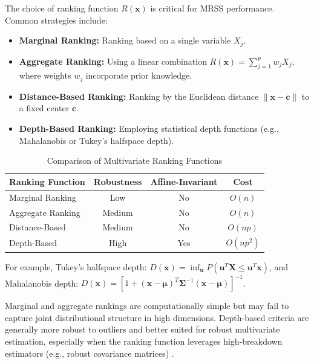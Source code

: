 \documentclass[12pt]{article}
\begin{document}
The choice of ranking function $R(\mathbf{x})$ is critical for MRSS performance. Common strategies include:
\begin{itemize}
    \item \textbf{Marginal Ranking:} Ranking based on a single variable $X_j$.
    \item \textbf{Aggregate Ranking:} Using a linear combination $R(\mathbf{x}) = \sum_{j=1}^{p} w_j X_j$, where weights $w_j$ incorporate prior knowledge.
    \item \textbf{Distance-Based Ranking:} Ranking by the Euclidean distance $\|\mathbf{x} - \mathbf{c}\|$ to a fixed center $\mathbf{c}$.
    \item \textbf{Depth-Based Ranking:} Employing statistical depth functions (e.g., Mahalanobis or Tukey's halfspace depth).
\end{itemize}
\begin{table}[H]
\centering
\caption{Comparison of Multivariate Ranking Functions}
\label{tab:ranking_comparison}
\begin{tabular}{lccc}
\toprule
\textbf{Ranking Function} & \textbf{Robustness} & \textbf{Affine-Invariant} & \textbf{Cost} \\
\midrule
Marginal Ranking & Low & No & $O(n)$ \\
Aggregate Ranking & Medium & No & $O(n)$ \\
Distance-Based & Medium & No & $O(np)$ \\
Depth-Based & High & Yes & $O(np^2)$ \\
\bottomrule
\end{tabular}
\end{table}
For example, Tukey's halfspace depth: $D(\mathbf{x}) = \inf_{\mathbf{u}} P(\mathbf{u}^T\mathbf{X} \leq \mathbf{u}^T\mathbf{x})$, and Mahalanobis depth: $D(\mathbf{x}) = [1 + (\mathbf{x} - \bm{\mu})^T \bm{\Sigma}^{-1} (\mathbf{x} - \bm{\mu})]^{-1}$.

Marginal and aggregate rankings are computationally simple but may fail to capture joint distributional structure in high dimensions. Depth-based criteria are generally more robust to outliers and better suited for robust multivariate estimation, especially when the ranking function leverages high-breakdown estimators (e.g., robust covariance matrices) \cite{taconeli2023}.
\end{document}
